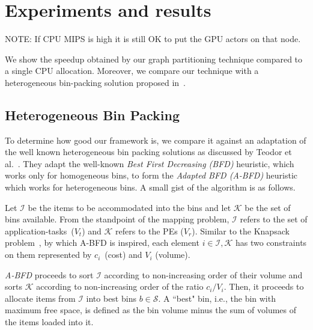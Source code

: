 \section{Experiments and results}
\label{sec:experiments-results}
NOTE: If CPU MIPS is high it is still OK to put the GPU actors on that
node.

We show the speedup obtained by our graph partitioning technique
compared to a single CPU allocation. Moreover, we compare our technique
with a heterogeneous bin-packing solution proposed in~\cite{mmar11}.


\subsection{Heterogeneous Bin Packing}

To determine how good our framework is, we compare it against an
adaptation of the well known heterogeneous bin packing solutions as
discussed by Teodor et al.~\cite{tcra11}. They adapt the well-known
\textit{Best First Decreasing (BFD)} heuristic, which works only for
homogeneous bins, to form the \textit{Adapted BFD (A-BFD)} heuristic
which works for heterogeneous bins. A small gist of the algorithm is as
follows.

Let $\mathcal{I}$ be the items to be accommodated into the bins and let
$\mathcal{K}$ be the set of bins available.  From the standpoint of the
mapping problem, $\mathcal{I}$ refers to the set of
\mbox{application-tasks ($V_t$)} and $\mathcal{K}$ refers to the PEs
($V_r$). Similar to the Knapsack problem~\cite{sski08}, by which A-BFD
is inspired, each element $i \in \mathcal{I}, \mathcal{K}$ has two
constraints on them represented by \mbox{$c_i$ (cost)} and $V_i$
(volume). %

\textit{A-BFD} proceeds to sort $\mathcal{I}$ according to
non-increasing order of their volume and sorts $\mathcal{K}$ according
to non-increasing order of the ratio $c_i/V_i$. Then, it proceeds to
allocate items from $\mathcal{I}$ into best bins $b \in \mathcal{S}$. A
``best" bin, i.e., the bin with maximum free space, is defined as the
bin volume minus the sum of volumes of the items loaded into
it. %

